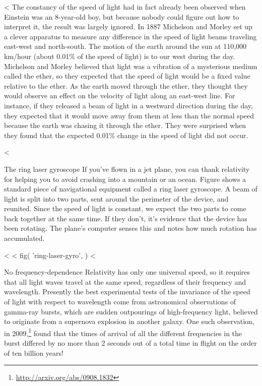     <%
The constancy of the speed of light had in fact already been
observed when Einstein was an 8-year-old boy, but because nobody could
figure out how to interpret it, the result was largely ignored.
In 1887 Michelson and Morley set up a clever apparatus to
measure any difference in the speed of light beams traveling
east-west and north-south. The motion of the earth around
the sun at 110,000 km/hour (about 0.01\% of the speed of
light) is to our west during the day. Michelson and Morley
believed that light was a vibration of a mysterious medium called the ether, so they expected that the
speed of light would be a fixed value relative to the ether.
As the earth moved through the ether, they thought they
would observe an effect on the velocity of light along an
east-west line. For instance, if they released a beam of
light in a westward direction during the day, they expected
that it would move away from them at less than the normal
speed because the earth was chasing it through the ether.
They were surprised when they found that the expected 0.01\%
change in the speed of light did not occur.

    <%

\begin{eg}{The ring laser gyroscope}
If you've flown in a jet plane, you can thank relativity for helping you to avoid
crashing into a mountain or an ocean. Figure  shows a standard
piece of navigational equipment called a ring laser gyroscope. A beam of light is
split into two parts, sent around the perimeter of the device, and reunited. Since
the speed of light is constant, we expect the two parts to come back together at the
same time. If they don't, it's evidence that the device has been rotating. The plane's
computer senses this and notes how much rotation has accumulated.
\end{eg}
<%
<%
  fig(
    'ring-laser-gyro',
  )
<%

\begin{eg}{No frequency-dependence}
Relativity has only one universal speed, so it requires that all light waves
travel at the same speed, regardless of their frequency and wavelength.
Presently the best experimental tests of the invariance of
the speed of light with respect to wavelength come from astronomical observations of
gamma-ray bursts, which are sudden
outpourings of high-frequency light, believed to originate from a supernova explosion
in another galaxy. One such observation,
in 2009,\footnote{\url{http://arxiv.org/abs/0908.1832}} 
found that the
times of arrival of all the different frequencies in the burst
differed by no more than 2 seconds out of a total time in flight on the order
of ten billion years!
\end{eg}

